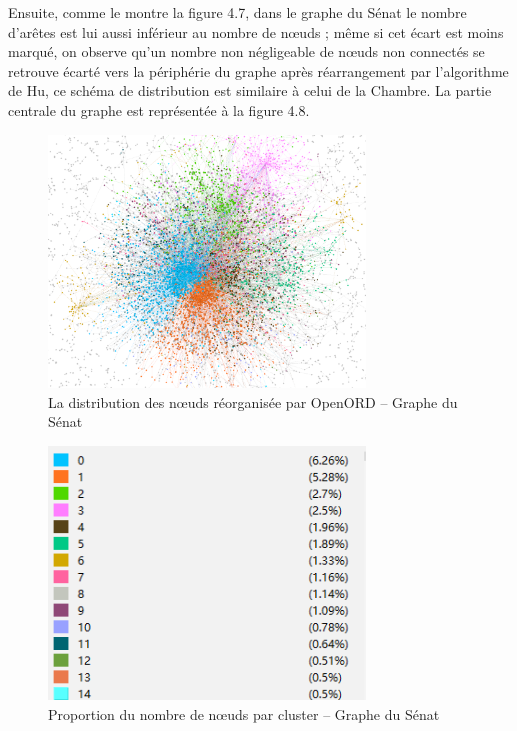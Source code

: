 \documentclass[a4paper,twoside,12pt]{book}
\begin{document}
Ensuite, comme le montre la figure 4.7, dans le graphe du Sénat le nombre d'arêtes est lui aussi inférieur au nombre de nœuds ; même si cet écart est moins marqué, on observe qu'un nombre non négligeable de nœuds non connectés se retrouve écarté vers la périphérie du graphe après réarrangement par l'algorithme de Hu, ce schéma de distribution est similaire à celui de la Chambre. La partie centrale du graphe est représentée à la figure 4.8.



\begin{figure}
\centering %
\includegraphics[width=0.75\textwidth]{img/senat_openord.png}
\caption{La distribution des nœuds réorganisée par OpenORD – Graphe du Sénat}
\end{figure}

\begin{figure}
\centering %
\includegraphics[width=0.75\textwidth]{img/senat_cluster.png}
\caption{Proportion du nombre de nœuds par cluster – Graphe du Sénat}
\end{figure}
\end{document}
